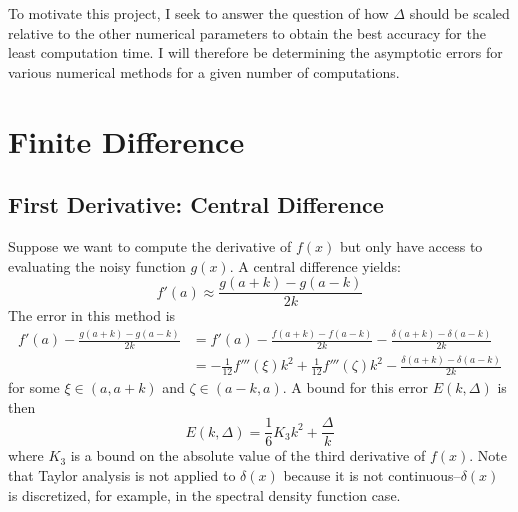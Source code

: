 \documentclass[letterpaper,11pt]{article}
\begin{document}
\begin{flushleft}
    To motivate this project, I seek to answer the question of how $\Delta$ should be scaled relative to the other numerical parameters to obtain the best accuracy for the least computation time. I will therefore be determining the asymptotic errors for various numerical methods for a given number of computations.

    \section{Finite Difference}

    \subsection{First Derivative: Central Difference}
    Suppose we want to compute the derivative of $f(x)$ but only have access to evaluating the noisy function $g(x)$. A central difference yields:
    $$f'(a) \approx \frac{g(a+k) - g(a-k)}{2k}$$
    The error in this method is
    \begin{align*}
        f'(a) - \frac{g(a+k) - g(a-k)}{2k} &= f'(a) - \frac{f(a+k) - f(a-k)}{2k} - \frac{\delta(a+k) - \delta(a-k)}{2k} \\
        &= -\frac{1}{12}f'''(\xi)k^2 + \frac{1}{12}f'''(\zeta)k^2 - \frac{\delta(a+k) - \delta(a-k)}{2k}
    \end{align*}
    for some $\xi \in (a, a+k)$ and $\zeta \in (a-k, a)$. A bound for this error $E(k, \Delta)$ is then
    $$E(k, \Delta) = \frac{1}{6}K_3k^2 + \frac{\Delta}{k}$$
    where $K_3$ is a bound on the absolute value of the third derivative of $f(x)$. Note that Taylor analysis is not applied to $\delta(x)$ because it is not continuous--$\delta(x)$ is discretized, for example, in the spectral density function case.
    

\end{flushleft}
\end{document}
